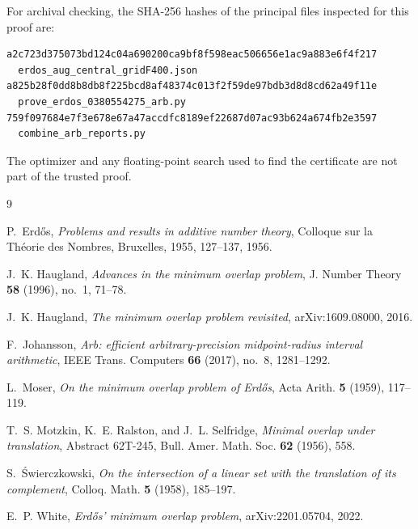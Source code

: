 \documentclass[a4paper]{amsart}
\begin{document}
For archival checking, the SHA-256 hashes of the principal files inspected for this proof are:
\begin{verbatim}
a2c723d375073bd124c04a690200ca9bf8f598eac506656e1ac9a883e6f4f217
  erdos_aug_central_gridF400.json
a825b28f0dd8b8db8f225bcd8af48374c013f2f59de97bdb3d8d8cd62a49f11e
  prove_erdos_0380554275_arb.py
759f097684e7f3e678e67a47accdfc8189ef22687d07ac93b624a674fb2e3597
  combine_arb_reports.py
\end{verbatim}
The optimizer and any floating-point search used to find the certificate are not part of the trusted proof.

\begin{thebibliography}{9}

P.~Erd\H{o}s, \emph{Problems and results in additive number theory}, Colloque sur la Th\'eorie des Nombres, Bruxelles, 1955, 127--137, 1956.

J.~K. Haugland, \emph{Advances in the minimum overlap problem}, J. Number Theory \textbf{58} (1996), no.~1, 71--78.

J.~K. Haugland, \emph{The minimum overlap problem revisited}, arXiv:1609.08000, 2016.

F.~Johansson, \emph{Arb: efficient arbitrary-precision midpoint-radius interval arithmetic}, IEEE Trans. Computers \textbf{66} (2017), no.~8, 1281--1292.

L.~Moser, \emph{On the minimum overlap problem of Erd\H{o}s}, Acta Arith. \textbf{5} (1959), 117--119.

T.~S. Motzkin, K.~E. Ralston, and J.~L. Selfridge, \emph{Minimal overlap under translation}, Abstract 62T-245, Bull. Amer. Math. Soc. \textbf{62} (1956), 558.

S.~\'Swierczkowski, \emph{On the intersection of a linear set with the translation of its complement}, Colloq. Math. \textbf{5} (1958), 185--197.

E.~P. White, \emph{Erd\H{o}s' minimum overlap problem}, arXiv:2201.05704, 2022.

\end{thebibliography}
\end{document}
